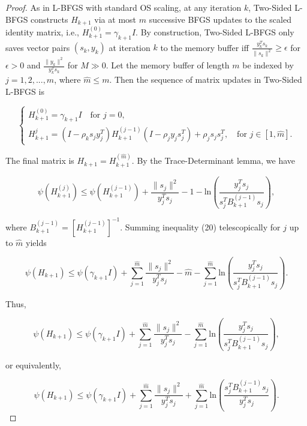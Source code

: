 \documentclass[twoside,11pt]{article}
\begin{document}
\begin{proof}
As in L-BFGS with standard OS scaling, at any iteration $k$, Two-Sided L-BFGS constructs $H_{k+1}$ via at most $m$ successive BFGS updates to the scaled identity matrix, i.e., $H_{k+1}^{(0)} = \gamma_{k+1}I$. By construction, Two-Sided L-BFGS only saves vector pairs $(s_k, y_k)$ at iteration $k$ to the memory buffer iff $\frac{y_k^T s_k}{\|s_k\|^2} \geq \epsilon$ for $\epsilon > 0$ and $\frac{\|y_k\|^2}{y_k^T s_k}$ for $M \gg 0$. Let the memory buffer of length $m$ be indexed by $j = 1,2, ..., \hat{m}$, where $\hat{m} \leq m$. Then the sequence of matrix updates in Two-Sided L-BFGS is

\begin{equation}
    \begin{cases}
        H_{k+1}^{(0)} = \gamma_{k+1}I \quad \text{for }j=0, \\
        H_{k+1}^{j} = (I - \rho_k s_jy_j^T)H_{k+1}^{(j-1)}(I - \rho_j y_j s_j^T) + \rho_j s_j s_j^T, \quad \text{for } j \in [1, \hat{m}].
    \end{cases}
\end{equation}

\noindent
The final matrix is $H_{k+1} = H_{k+1}^{(\hat{m})}$. By the Trace-Determinant lemma, we have

\begin{equation}
\psi(H_{k+1}^{(j)}) \leq \psi(H_{k+1}^{(j-1)}) + \frac{\|s_j\|^2}{y_j^T s_j} - 1 - \text{ln}(\frac{y_j^T s_j}{s_j^T B_{k+1}^{(j-1)}s_j}),
\end{equation}

\noindent
where $B_{k+1}^{(j-1)} = [H_{k+1}^{(j-1)}]^{-1}$. Summing inequality (20) telescopically for $j$ up to $\hat{m}$ yields

\begin{equation}
\psi(H_{k+1}) \leq \psi(\gamma_{k+1}I) + \sum_{j=1}^{\hat{m}}\frac{\|s_j\|^2}{y_j^T s_j} - \hat{m} - \sum_{j=1}^{\hat{m}}\text{ln}(\frac{y_j^T s_j}{s_j^T B_{k+1}^{(j-1)}s_j}).
\end{equation}

\noindent
Thus, 

\begin{equation}
\psi(H_{k+1}) \leq \psi(\gamma_{k+1}I) + \sum_{j=1}^{\hat{m}}\frac{\|s_j\|^2}{y_j^T s_j} - \sum_{j=1}^{\hat{m}}\text{ln}(\frac{y_j^T s_j}{s_j^T B_{k+1}^{(j-1)}s_j}),
\end{equation}

\noindent
or equivalently,

\begin{equation}
\psi(H_{k+1}) \leq \psi(\gamma_{k+1}I) + \sum_{j=1}^{\hat{m}}\frac{\|s_j\|^2}{y_j^T s_j} + \sum_{j=1}^{\hat{m}}\text{ln}(\frac{s_j^T B_{k+1}^{(j-1)}s_j}{y_j^T s_j}).
\end{equation}


\end{proof}
\end{document}
